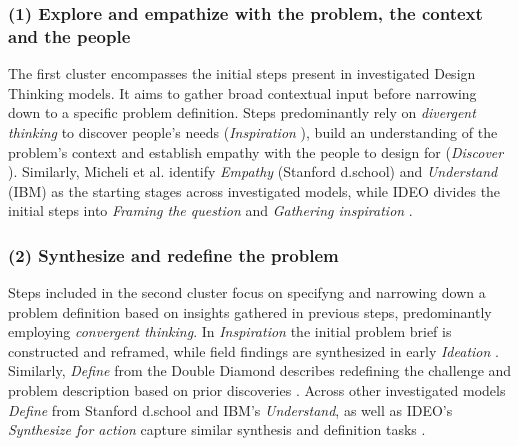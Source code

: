 \documentclass[draft,twoside]{vutinfth}
\begin{document}
            \subsubsection{(1) Explore and empathize with the problem, the context and the people}
                The first cluster encompasses the initial steps present in investigated Design Thinking models. It aims to gather broad 
                contextual input before narrowing down to a specific problem definition. Steps predominantly rely on \textit{divergent thinking} to 
                discover people's needs (\textit{Inspiration} \cite{brownDesignThinkingSocial2010}), build an understanding of the problem's context 
                and establish empathy with the people to design for (\textit{Discover} \cite{DoubleDiamondDesign}). 
                Similarly, Micheli et al. \cite{micheliDoingDesignThinking2019} 
                identify \textit{Empathy} (Stanford d.school) and \textit{Understand} (IBM) as the starting stages across investigated models, while 
                IDEO divides the initial steps into \textit{Framing the question} and \textit{Gathering inspiration} \cite{DesignThinkingIDEO}. 

            \subsubsection{(2) Synthesize and redefine the problem}
                Steps included in the second cluster focus on specifyng and narrowing down a problem definition based on insights gathered in previous steps,  
                predominantly employing \textit{convergent thinking}. In \textit{Inspiration} \cite{brownDesignThinkingSocial2010} the initial problem brief 
                is constructed and reframed, while field findings are synthesized in early \textit{Ideation} \cite{brownDesignThinkingSocial2010}. Similarly, 
                \textit{Define} from the Double Diamond describes redefining the challenge and problem description based on prior discoveries \cite{DoubleDiamondDesign}. 
                Across other investigated models \textit{Define} from Stanford d.school and IBM's \textit{Understand}, as well as IDEO's \textit{Synthesize for action} 
                capture similar synthesis and definition tasks \cite{micheliDoingDesignThinking2019,DesignThinkingIDEO}. 
\end{document}
